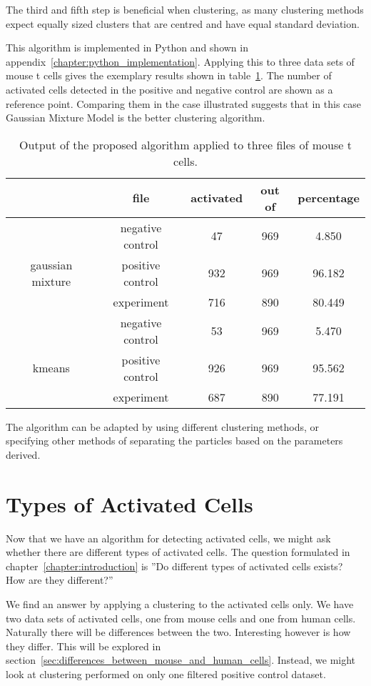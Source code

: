 The third and fifth step is beneficial when clustering, as many clustering methods expect equally sized clusters that are centred and have equal standard deviation. 

This algorithm is implemented in Python and shown in appendix~\ref{chapter:python_implementation}. Applying this to three data sets of mouse t cells gives the exemplary results shown in table~\ref{tab:results_main_algorithm}. The number of activated cells detected in the positive and negative control are shown as a reference point. Comparing them in the case illustrated suggests that in this case Gaussian Mixture Model is the better clustering algorithm.

\begin{table}[h]
	\centering
	\begin{tabular}{|c|c|c|c|c|}
		\hline
		 & file & activated & out of & percentage\\
		 \hline
		  & negative control & 47 & 969 & 4.850\\
		 gaussian mixture & positive control & 932 & 969 & 96.182\\
		  & experiment & 716 & 890 & 80.449\\
		 \hline
		  & negative control & 53 & 969 & 5.470\\
		 kmeans & positive control & 926 & 969 & 95.562\\
		  & experiment & 687 & 890 & 77.191\\
		 \hline
	\end{tabular}
	\caption{Output of the proposed algorithm applied to three files of mouse t cells.}
	\label{tab:results_main_algorithm}
\end{table}

The algorithm can be adapted by using different clustering methods, or specifying other methods of separating the particles based on the parameters derived.

\section{Types of Activated Cells}

Now that we have an algorithm for detecting activated cells, we might ask whether there are different types of activated cells. The question formulated in chapter~\ref{chapter:introduction} is ''Do different types of activated cells exists? How are they different?''

We find an answer by applying a clustering to the activated cells only. We have two data sets of activated cells, one from mouse cells and one from human cells. Naturally there will be differences between the two. Interesting however is how they differ. This will be explored in section~\ref{sec:differences_between_mouse_and_human_cells}. Instead, we might look at clustering performed on only one filtered positive control dataset.


